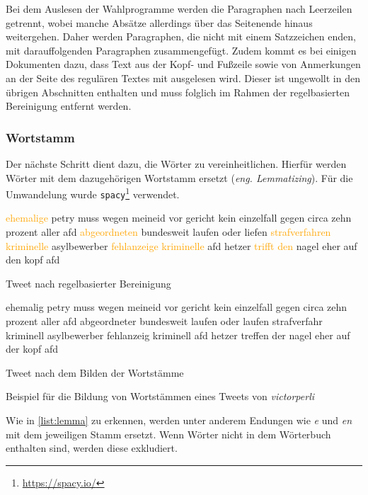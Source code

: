 Bei dem Auslesen der Wahlprogramme werden die Paragraphen nach Leerzeilen getrennt, wobei manche Absätze allerdings über das Seitenende hinaus weitergehen. Daher werden Paragraphen, die nicht mit einem Satzzeichen enden, mit darauffolgenden Paragraphen zusammengefügt. Zudem kommt es bei einigen Dokumenten dazu, dass Text aus der Kopf- und Fußzeile sowie von Anmerkungen an der Seite des regulären Textes mit ausgelesen wird. Dieser ist ungewollt in den übrigen Abschnitten enthalten und muss folglich im Rahmen der regelbasierten Bereinigung entfernt werden.

\subsubsection{Wortstamm}

Der nächste Schritt dient dazu, die Wörter zu vereinheitlichen. Hierfür werden Wörter mit dem dazugehörigen Wortstamm ersetzt (\textit{eng. Lemmatizing}). Für die Umwandelung wurde \texttt{spacy}\footnote{\href{https://spacy.io/}{https://spacy.io/}} verwendet.

\begin{example}[H]
    {\footnotesize
    \begin{subexample}{0.45\textwidth}
        \textcolor{orange}{ehemalige} petry muss wegen meineid vor gericht kein einzelfall gegen circa zehn prozent aller afd \textcolor{orange}{abgeordneten} bundesweit laufen oder liefen \textcolor{orange}{strafverfahren} \textcolor{orange}{kriminelle} asylbewerber \textcolor{orange}{fehlanzeige} \textcolor{orange}{kriminelle} afd hetzer \textcolor{orange}{trifft} \textcolor{orange}{den} nagel eher auf den kopf afd
        \caption{Tweet nach regelbasierter Bereinigung}
    \end{subexample}\hfill
    \begin{subexample}{0.45\textwidth}
        ehemalig petry muss wegen meineid vor gericht kein einzelfall gegen circa zehn prozent aller afd abgeordneter bundesweit laufen oder laufen strafverfahr kriminell asylbewerber fehlanzeig kriminell afd hetzer treffen der nagel eher auf der kopf afd
        \caption{Tweet nach dem Bilden der Wortstämme}
    \end{subexample}\hfill
    }
    \caption[Bildung von Wortstämmen]{Beispiel für die Bildung von Wortstämmen eines Tweets von \textit{victorperli} \autocite{saltzer_finding_2022}} \label{list:lemma}
\end{example}

Wie in \autoref{list:lemma} zu erkennen, werden unter anderem Endungen wie \textit{e} und \textit{en} mit dem jeweiligen Stamm ersetzt. Wenn Wörter nicht in dem Wörterbuch enthalten sind, werden diese exkludiert.

